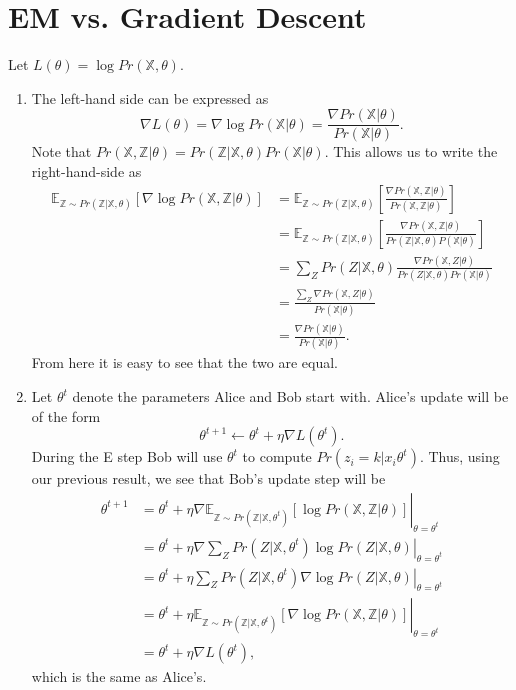 \documentclass{article}
\newcommand{\X}{\mathbb{X}}
\newcommand{\Z}{\mathbb{Z}}
\begin{document}

\section{EM vs. Gradient Descent}
Let $L(\theta) = \log Pr(\X,\theta)$.
\begin{enumerate}
    \item The left-hand side can be expressed as
    \[
        \nabla L(\theta) = \nabla \log Pr(\X|\theta) = \frac{\nabla Pr(\X|\theta)}{Pr(\X|\theta)}.
    \]
    Note that $Pr(\X,\Z|\theta) = Pr(\Z|\X,\theta)Pr(\X|\theta)$. This allows us to write the right-hand-side as
    \begin{align*}
        \mathbb{E}_{\Z\sim Pr(\Z|\X,\theta)}\left[\nabla\log Pr(\X,\Z|\theta)\right] &= \mathbb{E}_{\Z\sim Pr(\Z|\X,\theta)}\left[\frac{\nabla Pr(\X,\Z|\theta)}{Pr(\X,\Z|\theta)}\right]\\
        &= \mathbb{E}_{\Z\sim Pr(\Z|\X,\theta)}\left[\frac{\nabla Pr(\X,\Z|\theta)}{Pr(\Z|\X,\theta)P(\X|\theta)}\right]\\
        &=\sum_Z Pr(Z|\X,\theta)\frac{\nabla Pr(\X,Z|\theta)}{Pr(Z|\X,\theta)Pr(\X|\theta)}\\
        &=\frac{\sum_Z\nabla Pr(\X,Z|\theta)}{Pr(\X|\theta)}\\
        &= \frac{\nabla Pr(\X|\theta)}{Pr(\X|\theta)}.
    \end{align*}
    From here it is easy to see that the two are equal.
    \item Let $\theta^t$ denote the parameters Alice and Bob start with. Alice's update will be of the form
    \[
        \theta^{t+1} \leftarrow \theta^t + \eta \nabla L(\theta^t).
    \]
    During the E step Bob will use $\theta^t$ to compute $Pr(z_i=k|x_i\theta^t)$. Thus, using our previous result, we see that Bob's update step will be
    \begin{align*}
        \theta^{t+1} &= \theta^t + \eta \nabla\left.\mathbb{E}_{\Z\sim Pr(\Z|\X,\theta^t)}\left[\log Pr(\X,\Z|\theta)\right]\right|_{\theta=\theta^t}\\
        &=\theta^t+\eta \nabla\left.\sum_ZPr(Z|\X,\theta^t)\log Pr(Z|\X,\theta)\right|_{\theta=\theta^t}\\
        &=\theta^t+\eta\left.\sum_ZPr(Z|\X,\theta^t)\nabla\log Pr(Z|\X,\theta)\right|_{\theta=\theta^t}\\
        &=\theta^t+\eta\left.\mathbb{E}_{\Z\sim Pr(\Z|\X,\theta^t)}\left[\nabla \log Pr(\X,\Z|\theta)\right]\right|_{\theta=\theta^t}\\
        &=\theta^t + \eta \nabla L(\theta^t),
    \end{align*}
    which is the same as Alice's.


\end{enumerate}
\end{document}
